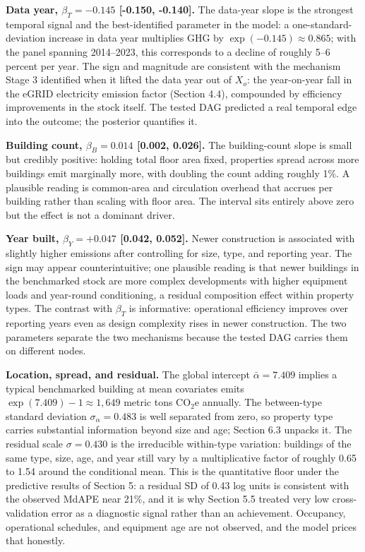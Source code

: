 \textbf{Data year, $\beta_T = -0.145$ [-0.150, -0.140].} The data-year slope is the strongest temporal signal and the best-identified parameter in the model: a one-standard-deviation increase in data year multiplies GHG by $\exp(-0.145) \approx 0.865$; with the panel spanning 2014--2023, this corresponds to a decline of roughly 5--6 percent per year. The sign and magnitude are consistent with the mechanism Stage 3 identified when it lifted the data year out of $X_o$: the year-on-year fall in the eGRID electricity emission factor (Section 4.4), compounded by efficiency improvements in the stock itself. The tested DAG predicted a real temporal edge into the outcome; the posterior quantifies it.

\textbf{Building count, $\beta_B = 0.014$ [0.002, 0.026].} The building-count slope is small but credibly positive: holding total floor area fixed, properties spread across more buildings emit marginally more, with doubling the count adding roughly 1\%. A plausible reading is common-area and circulation overhead that accrues per building rather than scaling with floor area. The interval sits entirely above zero but the effect is not a dominant driver.

\textbf{Year built, $\beta_Y = +0.047$ [0.042, 0.052].} Newer construction is associated with slightly higher emissions after controlling for size, type, and reporting year. The sign may appear counterintuitive; one plausible reading is that newer buildings in the benchmarked stock are more complex developments with higher equipment loads and year-round conditioning, a residual composition effect within property types. The contrast with $\beta_T$ is informative: operational efficiency improves over reporting years even as design complexity rises in newer construction. The two parameters separate the two mechanisms because the tested DAG carries them on different nodes.

\textbf{Location, spread, and residual.} The global intercept $\bar{\alpha} = 7.409$ implies a typical benchmarked building at mean covariates emits $\exp(7.409) - 1 \approx 1{,}649$ metric tons CO$_2$e annually. The between-type standard deviation $\sigma_\alpha = 0.483$ is well separated from zero, so property type carries substantial information beyond size and age; Section 6.3 unpacks it. The residual scale $\sigma = 0.430$ is the irreducible within-type variation: buildings of the same type, size, age, and year still vary by a multiplicative factor of roughly 0.65 to 1.54 around the conditional mean. This is the quantitative floor under the predictive results of Section 5: a residual SD of 0.43 log units is consistent with the observed MdAPE near 21\%, and it is why Section 5.5 treated very low cross-validation error as a diagnostic signal rather than an achievement. Occupancy, operational schedules, and equipment age are not observed, and the model prices that honestly.

